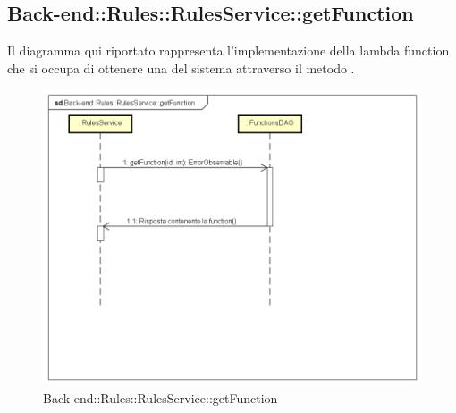 \subsection{Back-end::Rules::RulesService::getFunction}
Il diagramma qui riportato rappresenta l'implementazione della lambda function che si occupa di ottenere una  del sistema attraverso il metodo .
 \begin{figure}[h] \centering \includegraphics[width=\textwidth,height=\textheight,keepaspectratio]{images/diagrams/back-end/Ufficial_Backend/Back-endRulesRulesServicegetFunction.png} 	\caption{Back-end::Rules::RulesService::getFunction}
\end{figure}
\newpage

